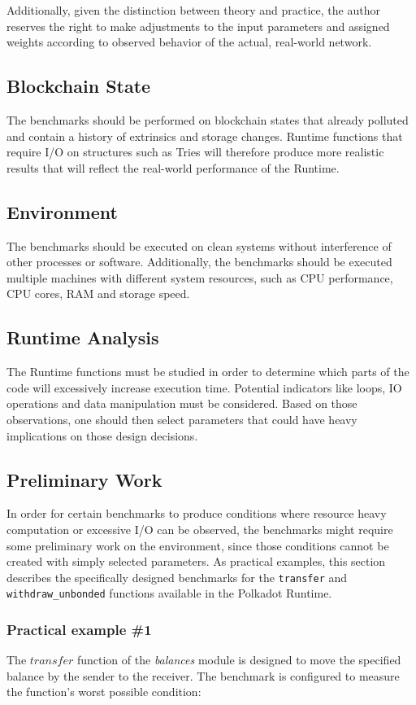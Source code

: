 \documentclass[11pt,a4paper]{article}
\begin{document}
Additionally, given the distinction between theory and practice, the author reserves the right
to make adjustments to the input parameters and assigned weights according to observed behavior
of the actual, real-world network.

\subsection{Blockchain State}
The benchmarks should be performed on blockchain states that already polluted and contain a history of
extrinsics and storage changes. Runtime functions that require I/O on structures
such as Tries will therefore produce more realistic results that will reflect the real-world
performance of the Runtime.

\subsection{Environment}
The benchmarks should be executed on clean systems without interference of other processes
or software. Additionally, the benchmarks should be executed multiple machines with different
system resources, such as CPU performance, CPU cores, RAM and storage speed.

\subsection{Runtime Analysis}
The Runtime functions must be studied in order to determine which parts of the code will excessively
increase execution time. Potential indicators like loops, IO operations and data manipulation must
be considered. Based on those observations, one should then select parameters that could have heavy
implications on those design decisions.

\subsection{Preliminary Work}
In order for certain benchmarks to produce conditions where resource heavy computation or excessive
I/O can be observed, the benchmarks might require some preliminary work on the environment, since those
conditions cannot be created with simply selected parameters.
As practical examples, this section describes the specifically designed benchmarks for the \verb|transfer|
and \verb|withdraw_unbonded| functions available in the Polkadot Runtime.

\subsubsection{Practical example \#1}
The $transfer$ function of the \textit{balances} module is designed to move the specified balance by the sender to the receiver.
The benchmark is configured to measure the function's worst possible condition:
\end{document}
